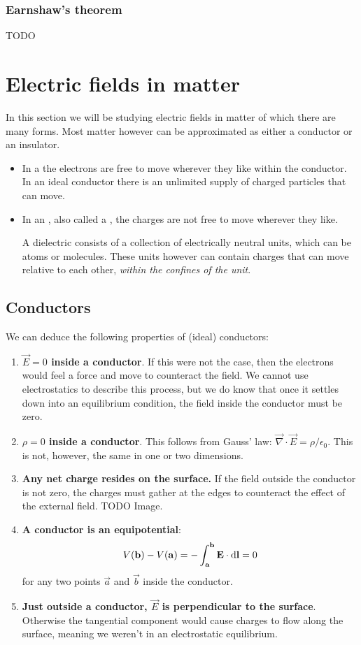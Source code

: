 \subsection{Earnshaw's theorem}
TODO

\chapter{Electric fields in matter}
In this section we will be studying electric fields in matter of which there are many forms. Most matter however can be approximated as either a conductor or an insulator.

\begin{itemize}
\item In a  the electrons are free to move wherever they like within the conductor. In an ideal conductor there is an unlimited supply of charged particles that can move.
\item In an , also called a , the charges are not free to move wherever they like.

A dielectric consists of a collection of electrically neutral units, which can be atoms or molecules. These units however can contain charges that can move relative to each other, \textit{within the confines of the unit}.
\end{itemize}

\section{Conductors}
We can deduce the following properties of (ideal) conductors:
\begin{enumerate}
\item \textbf{$\vec{E}=0$ inside a conductor}. If this were not the case, then the electrons would feel a force and move to counteract the field. We cannot use electrostatics to describe this process, but we do know that once it settles down into an equilibrium condition, the field inside the conductor must be zero.
\item \textbf{$\rho=0$ inside a conductor}. This follows from Gauss' law: $\vec{\nabla}\cdot \vec{E} = \rho / \epsilon_0$. This is not, however, the same in one or two dimensions.
\item \textbf{Any net charge resides on the surface.} If the field outside the conductor is not zero, the charges must gather at the edges to counteract the effect of the external field. TODO Image. 
\item \textbf{A conductor is an equipotential}:
\[ V(\bm{\mathrm{b}}) - V(\bm{\mathrm{a}}) = -\int^{\bm{\mathrm{b}}}_{\bm{\mathrm{a}}} \bm{\mathrm{E}}\cdot \operatorname{d \!}{\bm{\mathrm{l}}} = 0 \]
for any two points $\vec{a}$ and $\vec{b}$ inside the conductor.
\item \textbf{Just outside a conductor, $\vec{E}$ is perpendicular to the surface}. Otherwise the tangential component would cause charges to flow along the surface, meaning we weren't in an electrostatic equilibrium.
\end{enumerate}
